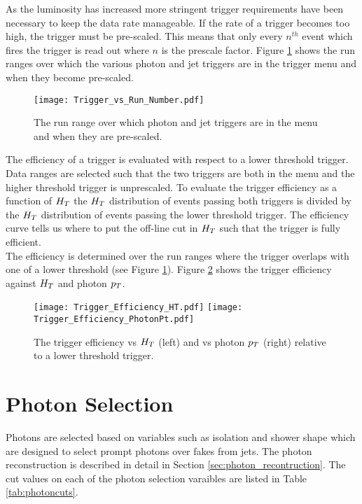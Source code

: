 As the luminosity has increased more stringent trigger requirements have been 
necessary to keep the data rate manageable. If the rate of a trigger becomes too
high, the trigger must be pre-scaled. This means that only every $n^{th}$ event 
which fires the trigger is read out where $n$ is the prescale factor. Figure 
\ref{fig:Trigger_vs_Run_Number} shows the run ranges over which the various 
photon and jet triggers are in the trigger menu and when they become pre-scaled.
\\

\begin{figure}
\begin{center}
\texttt{[image: Trigger\_vs\_Run\_Number.pdf]}
\end{center}
\caption{The run range over which photon and jet triggers are in the menu and
when they are pre-scaled.}
\label{fig:Trigger_vs_Run_Number}
\end{figure}

The efficiency of a trigger is evaluated with respect to a lower threshold
trigger. Data ranges are selected such that the two triggers are both in the
menu and the higher threshold trigger is unprescaled. To evaluate the trigger
efficiency as a function of $H_{T}$ the $H_{T}$ distribution of events passing both
triggers is divided by the $H_{T}$ distribution of events passing the lower
threshold trigger. The efficiency curve tells us where to put the off-line cut 
in $H_{T}$ such that the trigger is fully efficient. \\

The efficiency is determined over the run ranges where the trigger overlaps with
one of a lower threshold (see Figure \ref{fig:Trigger_vs_Run_Number}). Figure 
\ref{fig:Trigger_Efficiency} shows the trigger efficiency against $H_{T}$ and 
photon $p_{T}$.

\begin{figure}
\texttt{[image: Trigger\_Efficiency\_HT.pdf]}
\texttt{[image: Trigger\_Efficiency\_PhotonPt.pdf]}
\caption{The trigger efficiency vs $H_{T}$ (left) and vs photon $p_{T}$ (right)
relative to a lower threshold trigger.}
\label{fig:Trigger_Efficiency}
\end{figure}

\section{Photon Selection}

Photons are selected based on variables such as isolation and shower shape which
are designed to select prompt photons over fakes from jets. The photon 
reconstruction is described in detail in Section \ref{sec:photon_recontruction}. 
The cut values on each of the photon selection varaibles are listed in Table 
\ref{tab:photoncuts}. 

